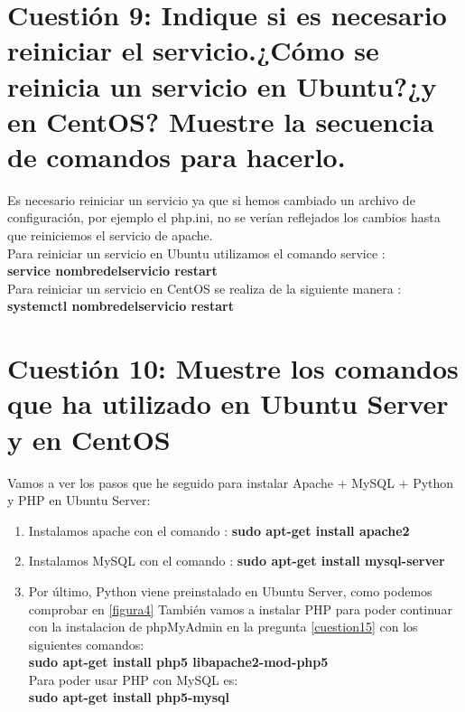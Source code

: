 \section{Cuestión 9: Indique si es necesario reiniciar el servicio.¿Cómo se reinicia un servicio en Ubuntu?¿y en CentOS? Muestre la secuencia de comandos para hacerlo.}

Es necesario reiniciar un servicio ya que si hemos cambiado un archivo de configuración, por ejemplo el php.ini, no se verían reflejados los cambios hasta que reiniciemos el servicio de apache.\\
Para reiniciar un servicio en Ubuntu utilizamos el comando service \cite{ubuntu-restart}:\\
\textbf{service nombredelservicio restart}\\
Para reiniciar un servicio en CentOS se realiza de la siguiente manera \cite{centOS-restart}:\\
\textbf{systemctl nombredelservicio restart}\\


\section{Cuestión 10: Muestre los comandos que ha utilizado en Ubuntu Server y en CentOS }

Vamos a ver los pasos que he seguido para instalar Apache + MySQL + Python y PHP en Ubuntu Server:
\begin{enumerate}
	\item Instalamos apache con el comando \cite{apache}: \textbf{sudo apt-get install apache2}
	\item Instalamos MySQL con el comando \cite{mysql}: \textbf{sudo apt-get install mysql-server}
	\item Por último, Python viene preinstalado en Ubuntu Server, como podemos comprobar en \ref{figura4}
	También vamos a instalar PHP para poder continuar con la instalacion de phpMyAdmin en la pregunta \ref{cuestion15} con los siguientes comandos:\\
	\textbf{sudo apt-get install php5 libapache2-mod-php5}\\
	Para poder usar PHP con MySQL es:\\
	\textbf{sudo apt-get install php5-mysql}
\end{enumerate}

